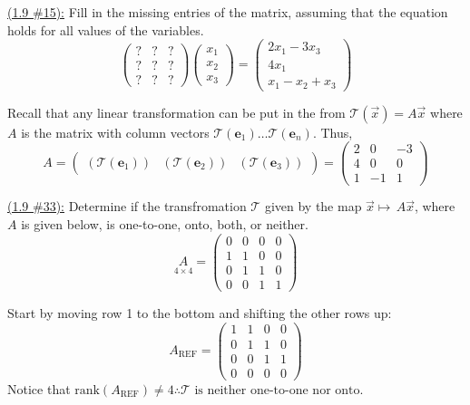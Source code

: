 \documentclass{exam}
\begin{document}
\underline{(1.9 \#15):} Fill in the missing entries of the matrix, assuming that the equation holds for all values of the variables.
\[
    \begin{pmatrix}
        ? & ? & ? \\
        ? & ? & ? \\
        ? & ? & ? 
    \end{pmatrix}
    \begin{pmatrix}
        x_1 \\ x_2 \\ x_3
    \end{pmatrix}
    = 
    \begin{pmatrix}
        2x_1 - 3x_3 \\
        4x_1 \\
        x_1 - x_2 + x_3
    \end{pmatrix}
\]
\begin{solution}
    Recall that any linear transformation can be put in the from $\mathcal{T}\left(\vec{x}\right) = A\vec{x}$ where $A$ is the matrix with column vectors $\mathcal{T}\left(\textbf{e}_1\right) \dots \mathcal{T}\left(\textbf{e}_n\right)$. Thus, 
    \[
        A = \begin{pmatrix}
            \left(\mathcal{T}\left({\textbf{e}_1}\right)\right) & 
            \left(\mathcal{T}\left({\textbf{e}_2}\right)\right) &
            \left(\mathcal{T}\left({\textbf{e}_3}\right)\right) 
        \end{pmatrix} 
        = 
        \boxed{
            \begin{pmatrix}
                2 & 0 & -3 \\
                4 & 0 & 0 \\
                1 & -1 & 1 
            \end{pmatrix}
        }
    \]
\end{solution}

\underline{(1.9 \#33):} Determine if the transfromation $\mathcal{T}$ given by the map $\vec{x}\mapsto\,A\vec{x}$, where $A$ is given below, is one-to-one, onto, both, or neither.
\[
    \underset{4 \times 4}{A} = \begin{pmatrix}
        0 & 0 & 0 & 0 \\
        1 & 1 & 0 & 0 \\
        0 & 1 & 1 & 0 \\
        0 & 0 & 1 & 1 
    \end{pmatrix}
\]
\begin{solution}
    Start by moving row 1 to the bottom and shifting the other rows up:
    \[
        A_{\text{REF}} = \begin{pmatrix}
            1 & 1 & 0 & 0 \\
            0 & 1 & 1 & 0 \\
            0 & 0 & 1 & 1 \\
            0 & 0 & 0 & 0 
        \end{pmatrix}
    \]
    Notice that $\text{rank}\left(A_{\text{REF}}\right) \ne 4 \therefore \boxed{\mathcal{T} \text{ is neither one-to-one nor onto.}}$
\end{solution}
\end{document}
